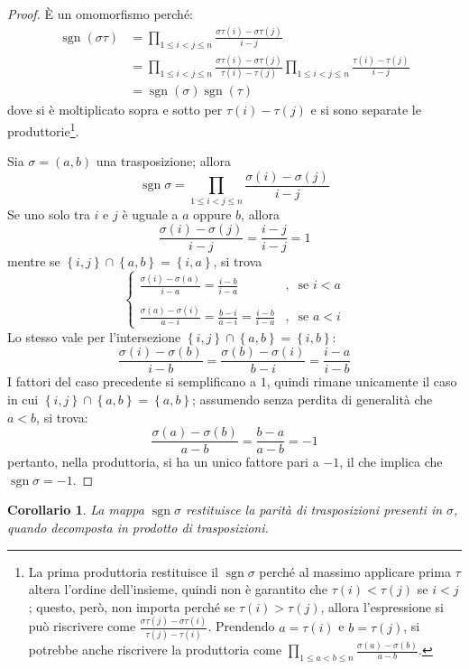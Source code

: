 \documentclass[12pt]{scrartcl}
\theoremstyle{style}
\newtheorem{corollario}{Corollario}[teorema]
\numberwithin{equation}{subsection}
\begin{document}
	\begin{proof}
		\`E un omomorfismo perch\'e:
		\[
			\begin{split}
				\operatorname{sgn} (\sigma \tau )&= \prod_{1\le i<j\le n} \frac{\sigma \tau (i)-\sigma \tau (j)}{i-j} \\
								 &=\prod_{1\le i<j\le n} \frac{\sigma \tau (i) - \sigma \tau (j)}{\tau (i) -\tau (j)}\prod_{1\le i<j\le n} \frac{\tau (i) - \tau (j)}{i - j}\\
								 &= \operatorname{sgn} (\sigma) \operatorname{sgn} (\tau)
			\end{split}
		\] 
		dove si \`e moltiplicato sopra e sotto per $\tau (i)-\tau (j)$ e si sono separate le produttorie\footnote{La prima produttoria restituisce il $\operatorname{sgn} \sigma $ perch\'e al massimo applicare prima $\tau $ altera l'ordine dell'insieme, quindi non \`e garantito che $\tau (i)< \tau (j)$ se $i<j$; questo, per\`o, non importa perch\'e se $\tau (i)>\tau (j)$, allora l'espressione si pu\`o riscrivere come $\frac{\sigma \tau (j) - \sigma \tau (i)}{\tau (j)-\tau (i)}$. Prendendo $a=\tau (i)$ e $b=\tau (j)$, si potrebbe anche riscrivere la produttoria come $\prod_{1\le a<b\le n} \frac{\sigma (a)-\sigma (b)}{a-b}$.}.

		Sia $\sigma =(a,b)$ una trasposizione; allora
		\[
		\operatorname{sgn} \sigma  = \prod_{1\le i<j\le n} \frac{\sigma (i)-\sigma (j)}{i-j}
		\] 
		Se uno solo tra $i$ e $j$ \`e uguale a $a$ oppure $b$, allora
		\[
		\frac{\sigma (i)-\sigma (j)}{i-j}=\frac{i-j}{i-j}=1
		\] 
		mentre se $\left\{ i,j \right\} \cap \left\{ a,b \right\} = \left\{ i,a \right\} $, si trova
		\[
			\begin{cases}
	\displaystyle 			\frac{\sigma (i) - \sigma (a)}{i-a} = \frac{i-b}{i-a}&,\ \text{ se } i<a\\
	\\
	\displaystyle \frac{\sigma (a) -\sigma (i)}{a-i}=\frac{b-i}{a-i}= \frac{i-b}{i-a}&,\ \text{ se } a < i
			\end{cases}
		\] 
		Lo stesso vale per l'intersezione $\left\{ i,j \right\} \cap \left\{ a,b \right\} = \left\{ i,b \right\} $:
		\[
		\frac{\sigma (i)-\sigma (b)}{i-b}=\frac{\sigma (b)-\sigma (i)}{b-i}=\frac{i-a}{i-b}
		\] 
		I fattori del caso precedente si semplificano a $1$, quindi rimane unicamente il caso in cui $\left\{ i,j \right\} \cap \left\{ a,b \right\} = \left\{ a,b \right\} $; assumendo senza perdita di generalit\`a che $a<b$, si trova:
		\[
		\frac{\sigma (a)-\sigma (b)}{a-b}=\frac{b-a}{a-b}=-1
		\] 
		pertanto, nella produttoria, si ha un unico fattore pari a $-1$, il che implica che $\operatorname{sgn} \sigma =-1$.
	\end{proof}
\begin{corollario}
	La mappa $\operatorname{sgn} \sigma $ restituisce la parit\`a di trasposizioni presenti in $\sigma $, quando decomposta in prodotto di trasposizioni.
\end{corollario}
\end{document}
